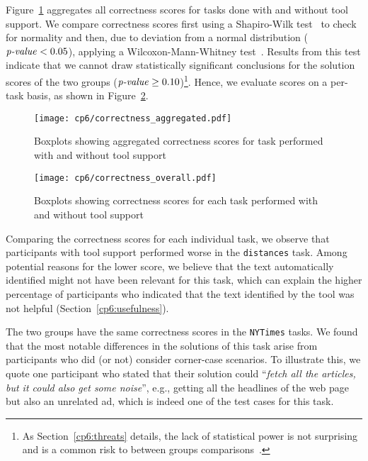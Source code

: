 Figure~\ref{fig:correctness-overall} aggregates all correctness scores for tasks done with and without tool support.
We compare correctness scores first using a Shapiro-Wilk test~\cite{wohlin2012} to check for normality and then, 
due to deviation from a normal distribution ($\text{\textit{p-value}} < 0.05$), applying a 
Wilcoxon-Mann-Whitney test~\cite{mannWhitneyU}.
Results from this test indicate that we cannot draw statistically significant conclusions
for the solution scores of the two groups ($\text{\textit{p-value}} \ge 0.10$)\footnote{
As Section~\ref{cp6:threats} details, the lack of statistical power is not surprising and is a common risk to between groups comparisons~\cite{Lazar2017}.}. Hence, we evaluate scores on a per-task basis, as shown in Figure~\ref{fig:correctness-by-task}.






\begin{figure}
    \centering
    \texttt{[image: cp6/correctness\_aggregated.pdf]}
    \caption{Boxplots showing aggregated correctness scores for task performed with and without tool support}
    \label{fig:correctness-overall}
\end{figure}


\begin{figure}
    \centering
    \texttt{[image: cp6/correctness\_overall.pdf]}
    \caption{Boxplots showing correctness scores for each task performed with and without tool support}
    \label{fig:correctness-by-task}
\end{figure}




Comparing the correctness scores for each individual task, we observe that participants with tool support performed worse in the \texttt{distances} task. 
Among potential reasons for the lower score, we believe that the text automatically identified 
might not have been relevant for this task, which can explain the higher percentage of participants
who indicated that the text identified by the tool was not helpful (Section~\ref{cp6:usefulness}).



The two groups have the same correctness scores in the \texttt{NYTimes} tasks.
We found that the most notable differences in the solutions of this task arise from participants who did (or not) consider corner-case scenarios.
To illustrate this, we quote one participant who stated that their solution could ``\textit{fetch all the articles, but it could also get some noise}'',
e.g., getting all the headlines of the web page but also an unrelated ad, which is indeed one of the test cases for this task. 



